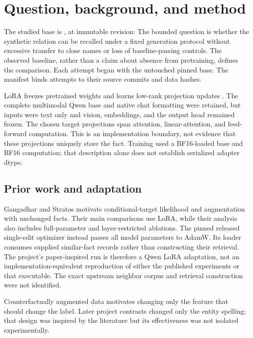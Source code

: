 \section{Question, background, and method}
The studied base is \texttt{\StudyModel}, at immutable revision:
\Fingerprint{\StudyRevision}
The bounded question is whether the synthetic relation can be recalled under a
fixed generation protocol without excessive transfer to close names or loss of
baseline-passing controls. The observed baseline, rather than a claim about
absence from pretraining, defines the comparison. Each attempt began with the
untouched pinned base. The manifest binds attempts to their source commits and
data hashes.\citep{historicalmanifest,retrospective}

LoRA freezes pretrained weights and learns low-rank projection updates
\citep{hu2021lora}. The complete multimodal Qwen base and native chat formatting
were retained, but inputs were text only and vision, embeddings, and the output
head remained frozen. The chosen target projections span attention,
linear-attention, and feed-forward computation. This is an implementation
boundary, not evidence that these projections uniquely store the fact.
Training used a BF16-loaded base and BF16 computation; that description alone
does not establish serialized adapter dtype.\citep{qwen35,qwen35template,retrospective}

\subsection{Prior work and adaptation}
Gangadhar and Stratos motivate conditional-target likelihood and augmentation
with unchanged facts. Their main comparisons use LoRA, while their analysis
also includes full-parameter and layer-restricted ablations. The pinned released
single-edit optimizer instead passes all model parameters to AdamW. Its loader
consumes supplied similar-fact records rather than constructing their
retrieval. The project's paper-inspired run is therefore a Qwen LoRA
adaptation, not an implementation-equivalent reproduction of either the
published experiments or that executable. The exact upstream neighbor corpus
and retrieval construction were not identified.\citep{gangadhar2024model,gangadhar2024run,gangadhar2024data}

Counterfactually augmented data motivates changing only the feature that should
change the label. Later project contrasts changed only the entity spelling;
that design was inspired by the literature but its effectiveness was not
isolated experimentally.\citep{kaushik2020cad,retrospective}

